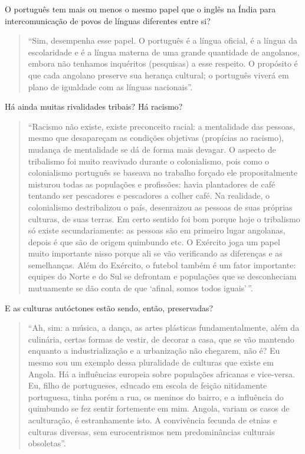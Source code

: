 \documentclass[
  letterpaper,
  DIV=11,
  numbers=noendperiod]{scrreprt}
\begin{document}
O português tem mais ou menos o mesmo papel que o inglês na Índia para
intercomunicação de povos de línguas diferentes entre si?

\begin{quote}
``Sim, desempenha esse papel. O português é a língua oficial, é a língua
da escolaridade e é a língua materna de uma grande quantidade de
angolanos, embora não tenhamos inquéritos (pesquisas) a esse respeito. O
propósito é que cada angolano preserve sua herança cultural; o português
viverá em plano de igualdade com as línguas nacionais''.
\end{quote}

Há ainda muitas rivalidades tribais? Há racismo?

\begin{quote}
``Racismo não existe, existe preconceito racial: a mentalidade das
pessoas, mesmo que desapareçam as condições objetivas (propícias ao
racismo), mudança de mentalidade se dá de forma mais devagar. O aspecto
de tribalismo foi muito reavivado durante o colonialismo, pois como o
colonialismo português se baseava no trabalho forçado ele
propositalmente misturou todas as populações e profissões: havia
plantadores de café tentando ser pescadores e pescadores a colher café.
Na realidade, o colonialismo destribalizou o país, desenraizou as
pessoas de suas próprias culturas, de suas terras. Em certo sentido foi
bom porque hoje o tribalismo só existe secundariamente: as pessoas são
em primeiro lugar angolanas, depois é que são de origem quimbundo etc. O
Exército joga um papel muito importante nisso porque ali se vão
verificando as diferenças e as semelhanças. Além do Exército, o futebol
também é um fator importante: equipes do Norte e do Sul se defrontam e
populações que se desconheciam mutuamente se dão conta de que `afinal,
somos todos iguais'\,''.
\end{quote}

E as culturas autóctones estão sendo, então, preservadas?

\begin{quote}
``Ah, sim: a música, a dança, as artes plásticas fundamentalmente, além
da culinária, certas formas de vestir, de decorar a casa, que se vão
mantendo enquanto a industrialização e a urbanização não chegarem, não
é? Eu mesmo sou um exemplo dessa pluralidade de culturas que existe em
Angola. Há a influências europeia sobre populações africanas e
vice-versa. Eu, filho de portugueses, educado em escola de feição
nitidamente portuguesa, tinha porém a rua, os meninos do bairro, e a
influência do quimbundo se fez sentir fortemente em mim. Angola, variam
os casos de aculturação, é estranhamente isto. A convivência fecunda de
etnias e culturas diversas, sem eurocentrismos nem predominâncias
culturais obsoletas''.
\end{quote}
\end{document}
